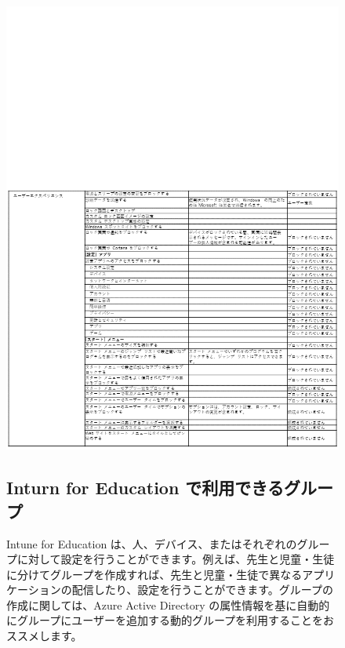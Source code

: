 \begin{figure}[htbp]
    \centering
    \vspace{-9cm}
    \includegraphics[width=17cm]{figures/IntuneforEducation-05.png}
    \vspace{10cm}
\end{figure}

\begin{figure}[htbp]
    \subsection{Inturn for Education で利用できるグループ}
    
    \hspace{8pt} Intune for Education は、人、デバイス、またはそれぞれのグループに対して設定を行うことができます。例えば、先生と児童・生徒に分けてグループを作成すれば、先生と児童・生徒で異なるアプリケーションの配信したり、設定を行うことができます。グループの作成に関しては、Azure Active Directory の属性情報を基に自動的にグループにユーザーを追加する動的グループを利用することをおススメします。
\end{figure}

